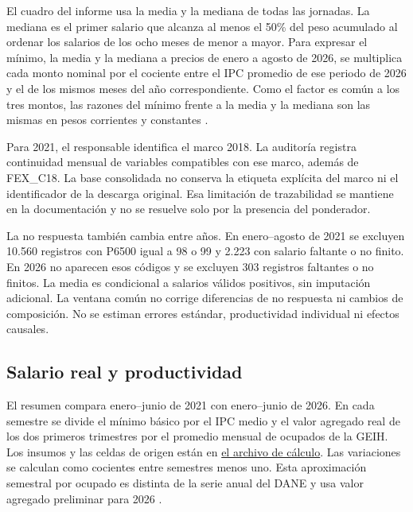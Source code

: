 El cuadro del informe usa la media y la mediana de todas las jornadas. La mediana es el primer salario que alcanza al menos el 50\% del peso acumulado al ordenar los salarios de los ocho meses de menor a mayor. Para expresar el mínimo, la media y la mediana a precios de enero a agosto de 2026, se multiplica cada monto nominal por el cociente entre el IPC promedio de ese periodo de 2026 y el de los mismos meses del año correspondiente. Como el factor es común a los tres montos, las razones del mínimo frente a la media y la mediana son las mismas en pesos corrientes y constantes \citep{geihTabulados,ipcEmpalme2026}.

Para 2021, el responsable identifica el marco 2018. La auditoría registra continuidad mensual de variables compatibles con ese marco, además de FEX\_C18. La base consolidada no conserva la etiqueta explícita del marco ni el identificador de la descarga original. Esa limitación de trazabilidad se mantiene en la documentación y no se resuelve solo por la presencia del ponderador.

La no respuesta también cambia entre años. En enero--agosto de 2021 se excluyen 10.560 registros con P6500 igual a 98 o 99 y 2.223 con salario faltante o no finito. En 2026 no aparecen esos códigos y se excluyen 303 registros faltantes o no finitos. La media es condicional a salarios válidos positivos, sin imputación adicional. La ventana común no corrige diferencias de no respuesta ni cambios de composición. No se estiman errores estándar, productividad individual ni efectos causales.

\subsection{Salario real y productividad}

El resumen compara enero--junio de 2021 con enero--junio de 2026. En cada semestre se divide el mínimo básico por el IPC medio y el valor agregado real de los dos primeros trimestres por el promedio mensual de ocupados de la GEIH. Los insumos y las celdas de origen están en \href{https://github.com/oliverpardo1979/Informe-CJC-SM/blob/main/data/brecha_primer_semestre_2021_2026.csv}{el archivo de cálculo}. Las variaciones se calculan como cocientes entre semestres menos uno. Esta aproximación semestral por ocupado es distinta de la serie anual del DANE y usa valor agregado preliminar para 2026 \citep{ipcEmpalme2026,vaSemestre2026,geihJunio2026,decreto1785,decreto1469}.

